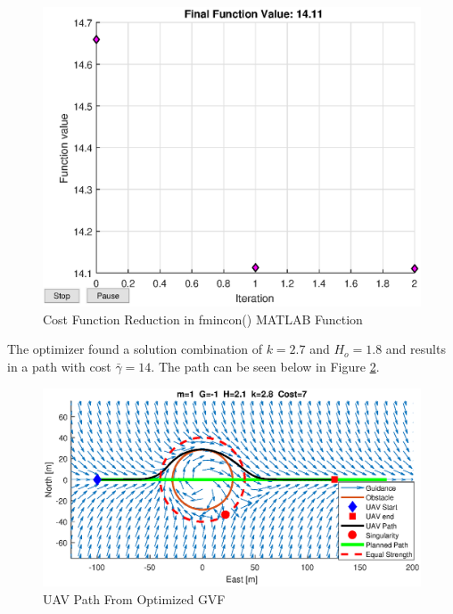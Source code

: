\documentclass[numbered,pdftex]{ohio-etd}
\begin{document}
\begin{figure}[H]
	\centering
	\includegraphics[width=12cm]{PaperFigures/Methods/finalFunctionValue}
	\caption{Cost Function Reduction in fmincon() MATLAB Function}
	\label{fig:finalfunctionvalue}
\end{figure}

The optimizer found a solution combination of $k=2.7$ and $H_o = 1.8$ and results in a path with cost $\bar{\gamma}=14$. The path can be seen below in Figure \ref{fig:optimizedPath}.

\begin{figure}[H]
	\centering
	\includegraphics[trim=0 85 0 85,clip,width=15cm]{PaperFigures/Methods/solvedN1V10}
	\caption{UAV Path From Optimized GVF}
	\label{fig:optimizedPath}
\end{figure}
\end{document}
